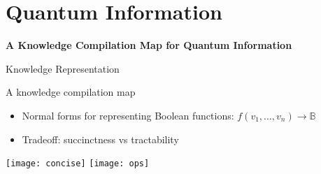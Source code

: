 \section{Quantum Information}


\begin{frame}
\begin{refsection}
	
\vfill

\vspace{-.5cm}\textbf{\Large A Knowledge Compilation Map for Quantum Information}~\cite{vinkhuijzen2024a}\vspace{-.5cm}

\vfill

\printbibliography[section=\therefsection]
\end{refsection}

\end{frame}



\begin{refframe}{Knowledge Representation}


    \begin{block}{A knowledge compilation map~\cite{darwiche2002knowledge}}
    \begin{itemize}
    \item  Normal forms for representing Boolean functions: $f(v_1,\dots, v_n) \rightarrow \mathbb B$
    \item Tradeoff: succinctness vs tractability
    \end{itemize}  
    \end{block}

\pause

\texttt{[image: concise]}
\texttt{[image: ops]}

\end{refframe}



